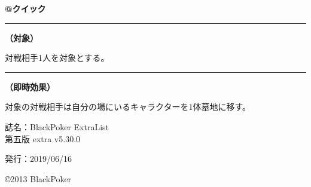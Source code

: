 \documentclass[twocolumn,a5paper,papersize,10pt]{jarticle}
\begin{document}
 
\begin{tcolorbox}[title={\small\bf【Action】薙払}{\scriptsize （兵士起因）}]

{\scriptsize\bf @クイック }

\vspace{1mm} %
\hrule height 0.1mm depth 0mm width 62mm %
\vspace{1mm} %

{\bf（対象）}

対戦相手1人を対象とする。

\vspace{1mm} %
\hrule height 0.1mm depth 0mm width 62mm %
\vspace{1mm} %

{\bf（即時効果）}

対象の対戦相手は自分の場にいるキャラクターを1体墓地に移す。

\vspace{1mm} %
\end{tcolorbox}

\vspace{-1zh}

 
 
 
 
\thispagestyle{empty}
\begin{flushright}
\begin{minipage}{0.6\hsize}
\begin{description}
  \item{誌名：}BlackPoker ExtraList\\ \hspace{3pt} 第五版 extra v5.30.0
  \item{発行：}2019/06/16
\end{description}
\end{minipage}
\end{flushright}

\begin{flushright}
\copyright 2013 BlackPoker
\end{flushright}
\end{document}
